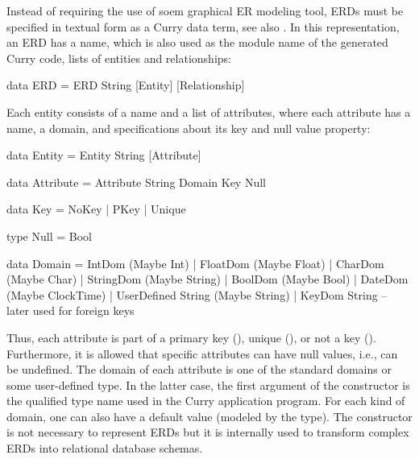 Instead of requiring the use of soem graphical ER modeling tool,
ERDs must be specified in textual form as a Curry data term,
see also \cite{BrasselHanusMueller08PADL}.
In this representation, an ERD has a name, which is also used
as the module name of the generated Curry code,
lists of entities and relationships:
%
\begin{curry}
data ERD = ERD String [Entity] [Relationship]
\end{curry}
%
Each entity consists of a name and a list of attributes, where
each attribute has a name, a domain, and specifications
about its key and null value property:
\begin{curry}
data Entity = Entity String [Attribute]

data Attribute = Attribute String Domain Key Null

data Key = NoKey | PKey | Unique

type Null = Bool

data Domain = IntDom             (Maybe Int)
            | FloatDom           (Maybe Float)
            | CharDom            (Maybe Char)
            | StringDom          (Maybe String)
            | BoolDom            (Maybe Bool)
            | DateDom            (Maybe ClockTime)
            | UserDefined String (Maybe String)
            | KeyDom String   -- later used for foreign keys
\end{curry}
%
Thus, each attribute is part of a primary key (),
unique (), or not a key ().
Furthermore, it is allowed that specific attributes can have null values, i.e.,
can be undefined. The domain of each attribute is one of the standard
domains or some user-defined type. In the latter case, the
first argument of the constructor 
is the qualified type name used in the Curry application program.
For each kind of domain, one can also have a default value
(modeled by the  type).
The constructor  is not necessary to represent ERDs
but it is internally used to transform complex ERDs
into relational database schemas.

